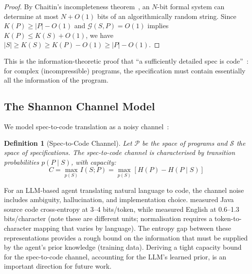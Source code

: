 \documentclass[11pt, a4paper, logo, copyright]{googledeepmind}
\newtheorem{definition}{Definition}[section]
\begin{document}
\begin{proof}
By Chaitin's incompleteness theorem~\citep{chaitin1966length}, an $N$-bit formal system can determine at most $N + O(1)$ bits of an algorithmically random string. Since $K(P) \geq |P| - O(1)$ and $\mathcal{G}(S, P) = O(1)$ implies $K(P) \leq K(S) + O(1)$, we have $|S| \geq K(S) \geq K(P) - O(1) \geq |P| - O(1)$.
\end{proof}

This is the information-theoretic proof that ``a sufficiently detailed spec is code''~\citep{gonzalez2026spec}: for complex (incompressible) programs, the specification must contain essentially all the information of the program.

\subsection{The Shannon Channel Model}

We model spec-to-code translation as a noisy channel~\citep{shannon1948mathematical}:

\begin{definition}[Spec-to-Code Channel]
Let $\mathcal{P}$ be the space of programs and $\mathcal{S}$ the space of specifications. The spec-to-code \emph{channel} is characterised by transition probabilities $p(P \mid S)$, with capacity:
\begin{equation}
    C = \max_{p(S)} I(S; P) = \max_{p(S)} \left[ H(P) - H(P \mid S) \right]
\end{equation}
\end{definition}

For an LLM-based agent translating natural language to code, the channel noise includes ambiguity, hallucination, and implementation choice. \citet{hindle2012naturalness} measured Java source code cross-entropy at 3--4 bits/token, while \citet{shannon1951prediction} measured English at 0.6--1.3 bits/character (note these are different units; normalisation requires a token-to-character mapping that varies by language). The entropy gap between these representations provides a rough bound on the information that must be supplied by the agent's prior knowledge (training data). Deriving a tight capacity bound for the spec-to-code channel, accounting for the LLM's learned prior, is an important direction for future work.
\end{document}
